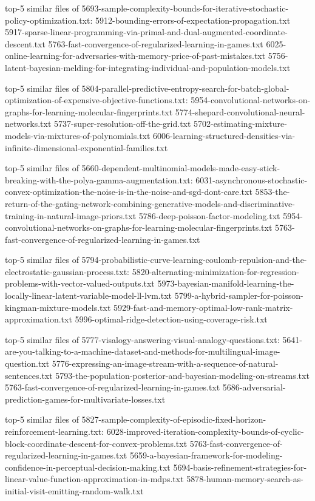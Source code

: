\documentclass[11pt]{article}
\begin{document}
top-5 similar files of
5693-sample-complexity-bounds-for-iterative-stochastic-policy-optimization.txt:
5912-bounding-errors-of-expectation-propagation.txt
5917-sparse-linear-programming-via-primal-and-dual-augmented-coordinate-descent.txt
5763-fast-convergence-of-regularized-learning-in-games.txt
6025-online-learning-for-adversaries-with-memory-price-of-past-mistakes.txt
5756-latent-bayesian-melding-for-integrating-individual-and-population-models.txt

top-5 similar files of
5804-parallel-predictive-entropy-search-for-batch-global-optimization-of-expensive-objective-functions.txt:
5954-convolutional-networks-on-graphs-for-learning-molecular-fingerprints.txt
5774-shepard-convolutional-neural-networks.txt
5737-super-resolution-off-the-grid.txt
5702-estimating-mixture-models-via-mixtures-of-polynomials.txt
6006-learning-structured-densities-via-infinite-dimensional-exponential-families.txt

top-5 similar files of
5660-dependent-multinomial-models-made-easy-stick-breaking-with-the-polya-gamma-augmentation.txt:
6031-asynchronous-stochastic-convex-optimization-the-noise-is-in-the-noise-and-sgd-dont-care.txt
5853-the-return-of-the-gating-network-combining-generative-models-and-discriminative-training-in-natural-image-priors.txt
5786-deep-poisson-factor-modeling.txt
5954-convolutional-networks-on-graphs-for-learning-molecular-fingerprints.txt
5763-fast-convergence-of-regularized-learning-in-games.txt

top-5 similar files of
5794-probabilistic-curve-learning-coulomb-repulsion-and-the-electrostatic-gaussian-process.txt:
5820-alternating-minimization-for-regression-problems-with-vector-valued-outputs.txt
5973-bayesian-manifold-learning-the-locally-linear-latent-variable-model-ll-lvm.txt
5799-a-hybrid-sampler-for-poisson-kingman-mixture-models.txt
5929-fast-and-memory-optimal-low-rank-matrix-approximation.txt
5996-optimal-ridge-detection-using-coverage-risk.txt

top-5 similar files of
5777-visalogy-answering-visual-analogy-questions.txt:
5641-are-you-talking-to-a-machine-dataset-and-methods-for-multilingual-image-question.txt
5776-expressing-an-image-stream-with-a-sequence-of-natural-sentences.txt
5793-the-population-posterior-and-bayesian-modeling-on-streams.txt
5763-fast-convergence-of-regularized-learning-in-games.txt
5686-adversarial-prediction-games-for-multivariate-losses.txt

top-5 similar files of
5827-sample-complexity-of-episodic-fixed-horizon-reinforcement-learning.txt:
6028-improved-iteration-complexity-bounds-of-cyclic-block-coordinate-descent-for-convex-problems.txt
5763-fast-convergence-of-regularized-learning-in-games.txt
5659-a-bayesian-framework-for-modeling-confidence-in-perceptual-decision-making.txt
5694-basis-refinement-strategies-for-linear-value-function-approximation-in-mdps.txt
5878-human-memory-search-as-initial-visit-emitting-random-walk.txt
\end{document}
